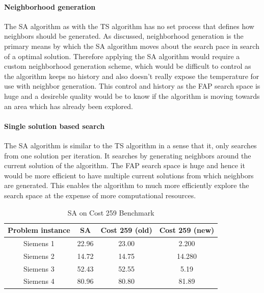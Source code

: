 \paragraph{Neighborhood generation}
The SA algorithm as with the TS algorithm has no set process that defines how neighbors should be generated. As discussed, neighborhood generation is the primary means by which the SA algorithm moves about the search pace in search of a optimal solution. Therefore applying the SA algorithm would require a custom neighborhood generation scheme, which would be difficult to control as the algorithm keeps no history and also doesn't really expose the temperature for use with neighbor generation. This control and history as the FAP search space is huge and a desireble quality would be to know if the algorithm is moving towards an area which has already been explored.
\paragraph{Single solution based search}
The SA algorithm is similar to the TS algorithm in a sense that it, only searches from one solution per iteration. It searches by generating neighbors around the current solution of the algorithm. The FAP search space is huge and hence it would be more efficient to have multiple current solutions from which neighbors are generated. This enables the algorithm to much more efficiently explore the search space at the expense of more computational resources.
\begin{table}
\centering
	\begin{tabular}{| c | c | c | c |}
	\hline
	Problem instance & SA & Cost 259 (old) & Cost 259 (new) \\ \hline
	Siemens 1 & 22.96 & 23.00 & 2.200\\ \hline
	Siemens 2 & 14.72 & 14.75 & 14.280\\ \hline
	Siemens 3 & 52.43 & 52.55 & 5.19\\ \hline
	Siemens 4 & 80.96 & 80.80 & 81.89\\ \hline
	\end{tabular}
\caption{SA on Cost 259 Benchmark}
\end{table}

